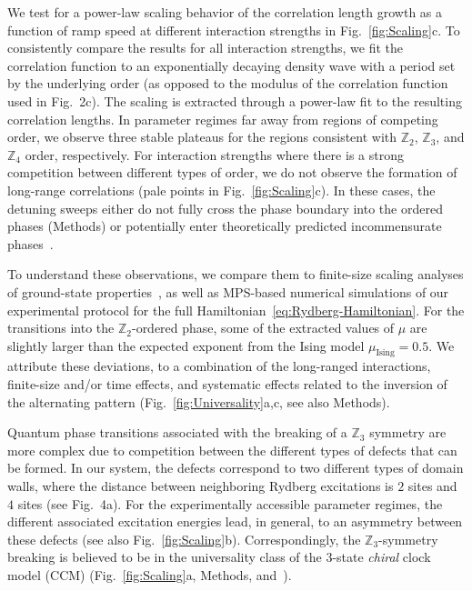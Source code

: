 \documentclass[prl,nobalancelastpage,superscriptaddress,twocolumn,nofootinbib]{revtex4}
\begin{document}
We test for a power-law scaling behavior of the correlation length growth as a function of ramp speed at different interaction strengths in  Fig.~\ref{fig:Scaling}c. To consistently compare the results for all interaction strengths, we fit the correlation function to an exponentially decaying density wave with a period set by the underlying order (as opposed to the modulus of the correlation function used in Fig.~2c). 
The scaling is extracted through a power-law fit to the resulting correlation lengths. In parameter regimes far away from regions of competing order, we observe three stable plateaus for the regions consistent with $\mathbb{Z}_2$, $\mathbb{Z}_3$, and $\mathbb{Z}_4$ order, respectively. For interaction strengths where there is a strong competition between different types of order, we do not observe the formation of long-range correlations (pale points in Fig.~\ref{fig:Scaling}c). In these cases, the detuning sweeps either do not fully cross the phase boundary into the ordered phases (Methods) or potentially enter theoretically predicted incommensurate phases~\cite{Ostlund1981,Fendley2004}.

To understand these observations, we compare them to finite-size scaling analyses of ground-state properties~\cite{Samajdar2018, Whitsitt2018, Chepiga2018}, as well as MPS-based numerical simulations of our experimental protocol
for the full Hamiltonian~\eqref{eq:Rydberg-Hamiltonian}. For the transitions into the $\mathbb{Z}_2$-ordered phase, some of the extracted values of $\mu$ are slightly larger than the expected exponent from the Ising model 
$\mu_{\text{Ising}}=0.5$. We attribute these deviations, 
to a combination of the long-ranged interactions, finite-size and/or time effects, and systematic effects related to the inversion of the alternating pattern (Fig.~\ref{fig:Universality}a,c, see also Methods). 

Quantum phase transitions associated with the breaking of a $\mathbb{Z}_3$ symmetry are more complex due to competition between the different types of 
defects that can be formed. In our system, the defects correspond to two different types of domain walls, where the distance between neighboring Rydberg excitations is $2$ sites and $4$ sites (see Fig.~4a). For the experimentally accessible parameter regimes, the different associated excitation energies lead, in general, to an asymmetry between these defects (see also Fig.~\ref{fig:Scaling}b). Correspondingly, the $\mathbb{Z}_3$-symmetry breaking is believed to be in the universality class of the $3$-state \textit{chiral} clock model (CCM) (Fig.~\ref{fig:Scaling}a, Methods, and~\cite{Samajdar2018}). 
\end{document}
